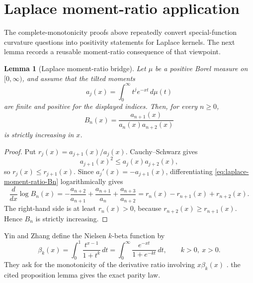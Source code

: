 \documentclass[11pt]{article}
\numberwithin{equation}{section}
\newtheorem{lemma}[theorem]{Lemma}
\theoremstyle{definition}
\theoremstyle{remark}
\newcommand{\1}{\mathbf 1}
\begin{document}
\section{Laplace moment-ratio application}
\label{sec:laplace-moment-ratio-application}



The complete-monotonicity proofs above repeatedly convert special-function curvature questions into positivity statements for Laplace kernels.  The next lemma records a reusable moment-ratio consequence of that viewpoint.

\begin{lemma}[Laplace moment-ratio bridge]
\label{lem:laplace-moment-ratio-bridge}
Let \(\mu\) be a positive Borel measure on \([0,\infty)\), and assume that the tilted moments
\begin{equation}
\label{eq:laplace-moment-ratio-aj}
a_j(x)=\int_0^\infty t^j e^{-xt}\,d\mu(t)
\end{equation}
are finite and positive for the displayed indices.  Then, for every \(n\ge0\),
\begin{equation}
\label{eq:laplace-moment-ratio-Bn}
B_n(x)=\frac{a_{n+1}(x)}{a_n(x)a_{n+2}(x)}
\end{equation}
is strictly increasing in \(x\).
\end{lemma}

\begin{proof}
Put \(r_j(x)=a_{j+1}(x)/a_j(x)\).  Cauchy--Schwarz gives
\begin{equation}
\label{eq:laplace-moment-log-convexity}
a_{j+1}(x)^2\le a_j(x)a_{j+2}(x),
\end{equation}
so \(r_j(x)\le r_{j+1}(x)\).  Since \(a_j'(x)=-a_{j+1}(x)\), differentiating \eqref{eq:laplace-moment-ratio-Bn} logarithmically gives
\begin{equation}
\label{eq:laplace-moment-ratio-derivative}
\frac{d}{dx}\log B_n(x)
=-\frac{a_{n+2}}{a_{n+1}}
+\frac{a_{n+1}}{a_n}
+\frac{a_{n+3}}{a_{n+2}}
=r_n(x)-r_{n+1}(x)+r_{n+2}(x).
\end{equation}
The right-hand side is at least \(r_n(x)>0\), because \(r_{n+2}(x)\ge r_{n+1}(x)\).  Hence \(B_n\) is strictly increasing.
\end{proof}

Yin and Zhang define the Nielsen \(k\)-beta function by
\begin{equation}
\label{eq:nielsen-k-beta-definition}
\beta_k(x)=\int_0^1\frac{t^{x-1}}{1+t^k}\,dt
=\int_0^\infty\frac{e^{-xt}}{1+e^{-kt}}\,dt,
\qquad k>0,\ x>0.
\end{equation}
They ask for the monotonicity of the derivative ratio involving \(x\beta_k(x)\) \cite{yin-zhang-k-beta}.  the cited proposition lemma gives the exact parity law.
\end{document}
